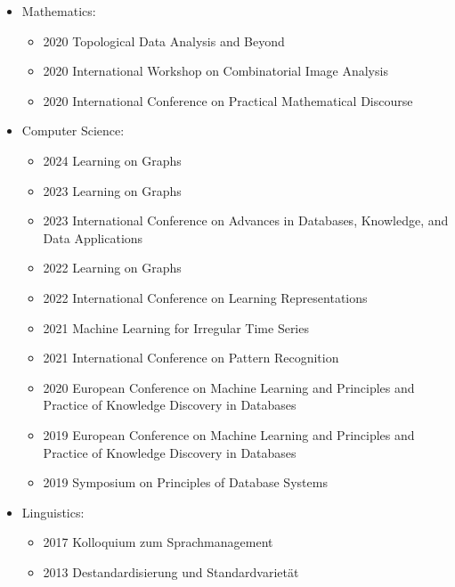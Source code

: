 \documentclass[a4paper, 11pt]{article}
\newcommand{\years}[1]{\marginnote{\scriptsize #1}}
\begin{document}
	\years{Conferences}
	\vspace{-10pt}
	\begin{itemize}[noitemsep, leftmargin=*]
		\item Mathematics:
			\begin{itemize}[noitemsep, leftmargin=*]
				\item 2020 Topological Data Analysis and Beyond

				\item 2020 International Workshop on Combinatorial Image Analysis

				\item 2020 International Conference on Practical Mathematical Discourse
			\end{itemize}

		\item Computer Science:
			\begin{itemize}[noitemsep, leftmargin=*]
				\item 2024 Learning on Graphs

				\item 2023 Learning on Graphs

				\item 2023 International Conference on Advances in Databases, Knowledge,
					and Data Applications

				\item 2022 Learning on Graphs

				\item 2022 International Conference on Learning Representations

				\item 2021 Machine Learning for Irregular Time Series

				\item 2021 International Conference on Pattern Recognition

				\item 2020 European Conference on Machine Learning and Principles and Practice
					of Knowledge Discovery in Databases

				\item 2019 European Conference on Machine Learning and Principles and Practice
					of Knowledge Discovery in Databases

				\item 2019 Symposium on Principles of Database Systems
			\end{itemize}

		\item Linguistics:
			\begin{itemize}[noitemsep, leftmargin=*]
				\item 2017 Kolloquium zum Sprachmanagement

				\item 2013 Destandardisierung und Standardvarietät
			\end{itemize}
	\end{itemize}
	\vspace{10pt}
\end{document}
